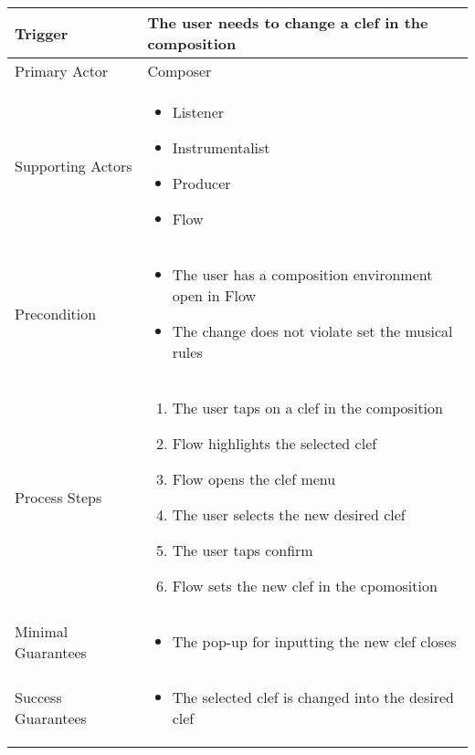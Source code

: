 \begin{longtable}{|X|X|}
\hline
Trigger & 
The user needs to change a clef in the composition \\
\hline
Primary Actor & 
Composer \\
\hline
Supporting Actors & 
\begin{itemize}
\item Listener
\item Instrumentalist
\item Producer
\item Flow
\end{itemize} \\
\hline
Precondition & 
\begin{itemize}
\item The user has a composition environment open in Flow
\item The change does not violate set the musical rules
\end{itemize} \\
\hline
Process Steps & 
\begin{enumerate}
\item The user taps on a clef in the composition
\item Flow highlights the selected clef
\item Flow opens the clef menu
\item The user selects the new desired clef
\item The user taps confirm
\item Flow sets the new clef in the cpomosition
\end{enumerate} \\
\hline
Minimal Guarantees & 
\begin{itemize}
  \item The pop-up for inputting the new clef closes
\end{itemize} \\
\hline
Success Guarantees & 
\begin{itemize}
  \item The selected clef is changed into the desired clef
\end{itemize} \\
\hline
\end{longtable}